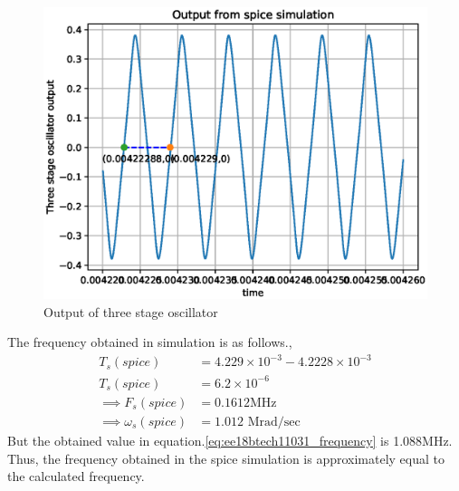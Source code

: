 \begin{enumerate}[label=\thesubsection.\arabic*.,ref=\thesubsection.\theenumi]
\begin{figure}[!ht]
\centering
\includegraphics[width=\columnwidth]{./figs/ee18btech11031/ee18btech11031_spice_2.eps}
\caption{Output of three stage oscillator}
\label{fig:ee18btech11031_spice2}
\end{figure}
The frequency obtained in simulation is as follows.,
 \begin{align}
     T_s(spice) &= 4.229\times10^{-3} - 4.2228\times10^{-3}\\
     T_s(spice) &= 6.2\times10^{-6}\\
     \implies F_s(spice) &= 0.1612 \text{MHz}\\
     \implies \omega_s(spice) &= 1.012 \text{ Mrad/sec}
 \end{align}
But the obtained value in equation.\ref{eq:ee18btech11031_frequency} is 1.088MHz.
Thus, the frequency obtained in the spice simulation is approximately equal to the calculated frequency.
\end{enumerate}


